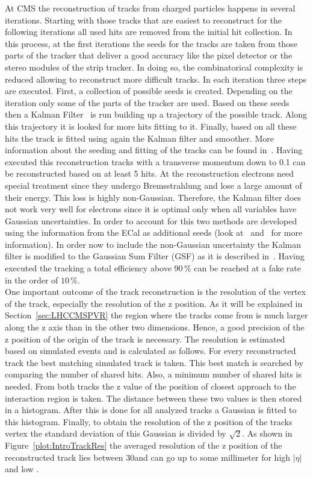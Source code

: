 At CMS the reconstruction of tracks from charged particles happens in several iterations. Starting with those tracks that are easiest to reconstruct for the following iterations all used hits are removed from the initial hit collection. In this process, at the first iterations the seeds for the tracks are taken from those parts of the tracker that deliver a good accuracy like the pixel detector or the stereo modules of the strip tracker. In doing so, the combinatorical complexity is reduced allowing to reconstruct more difficult tracks. In each iteration three steps are executed. First, a collection of possible seeds is created. Depending on the iteration only some of the parts of the tracker are used. Based on these seeds then a Kalman Filter~\cite{Fruhwirth:1987fm} is run building up a trajectory of the possible track. Along this trajectory it is looked for more hits fitting to it. Finally, based on all these hits the track is fitted using again the Kalman filter and smoother. More information about the seeding and fitting of the tracks can be found in~. Having executed this reconstruction tracks with a transverse momentum down to 0.1\GeVc{} can be reconstructed based on at least 5 hits. At the reconstruction electrons need special treatment since they undergo Bremsstrahlung and lose a large amount of their energy. This loss is highly non-Gaussian. Therefore, the Kalman filter does not work very well for electrons since it is optimal only when all variables have Gaussian uncertainties. In order to account for this two methods are developed using the information from the ECal as additional seeds (look at~ and~ for more information). In order now to include the non-Gaussian uncertainty the Kalman filter is modified to the Gaussian Sum Filter (GSF) as it is described in~. Having executed the tracking a total efficiency above $90\,\%$ can be reached at a fake rate in the order of $10\,\%$. \\
One important outcome of the track reconstruction is the resolution of the vertex of the track, especially the resolution of the z position. As it will be explained in Section~\ref{sec:LHCCMSPVR} the region where the tracks come from is much larger along the z axis than in the other two dimensions. Hence, a good precision of the z position of the origin of the track is necessary. The resolution is estimated based on simulated events and is calculated as follows. For every reconstructed track the best matching simulated track is taken. This best match is searched by comparing the number of shared hits. Also, a minimum number of shared hits is needed. From both tracks the z value of the position of closest approach to the interaction region is taken. The distance between these two values is then stored in a histogram. After this is done for all analyzed tracks a Gaussian is fitted to this histogram. Finally, to obtain the resolution of the z position of the tracks vertex the standard deviation of this Gaussian is divided by $\sqrt{2}$.  As shown in Figure~\ref{plot:IntroTrackRes} the averaged resolution of the z position of the reconstructed track lies between 30\mum and can go up to some millimeter for high $\left|\eta\right|$ and low \pt{}.

